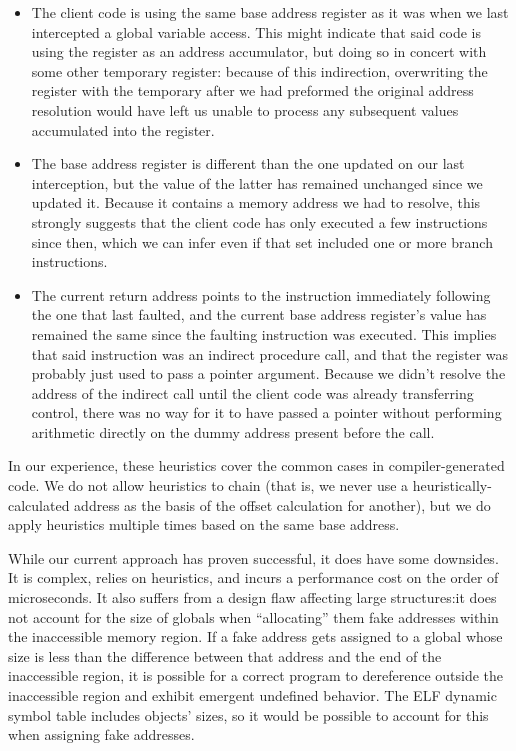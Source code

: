 \begin{itemize}
\item The client code is using the same base address register as it was when
	we last intercepted a global variable access.  This might indicate that
	said code is using the register as an address accumulator, but doing
	so in concert with some other temporary register: because of this
	indirection, overwriting the register with the temporary after we
	had preformed the original address resolution would have left us
	unable to process any subsequent values accumulated into the register.
\item The base address register is different than the one updated on our last
	interception, but the value of the latter has
	remained unchanged since we updated it.  Because it contains a memory
	address we had to resolve, this strongly suggests that the client code
	has only executed a few instructions since then, which we can infer
	even if that set included one or more branch instructions.
\item The current return address points to the instruction immediately
	following the one that last faulted,
	and the current base address register's value has
	remained the same since the faulting instruction was executed.  This
	implies that said instruction was an indirect procedure call, and that
	the register was probably just used to pass a pointer argument.
	Because we didn't resolve the address of the indirect call until the
	client code was already transferring control, there was no way for it
	to have passed a pointer without performing arithmetic directly on the
	dummy address present before the call.
\end{itemize}

In our experience, these heuristics cover the common cases in compiler-generated
code.  We do not allow heuristics to chain (that is, we never use a
heuristically-calculated address as the basis of the offset calculation for another),
but we do apply heuristics multiple times based on the same base address.

While our current approach has proven successful, it does have some downsides.  It is
complex, relies on heuristics, and incurs a performance cost on the order of
microseconds.  It also suffers from a design flaw affecting large structures:\@ it
does not account for the size of globals when ``allocating'' them fake addresses
within the inaccessible memory region.  If a fake address gets assigned to a global
whose size is less than the difference between that address and the end of the
inaccessible region, it is possible for a correct program to dereference outside the
inaccessible region and exhibit emergent undefined behavior.  The ELF dynamic symbol
table includes objects' sizes, so it would be possible to account for this when
assigning fake addresses.

